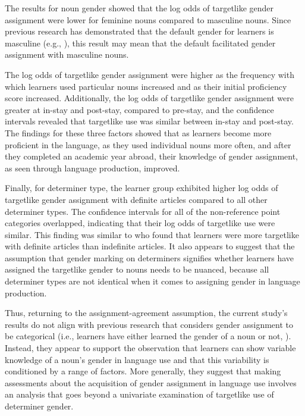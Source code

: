\documentclass[output=paper,colorlinks,citecolor=brown,modfonts,nonflat]{../langscibook}
\begin{document}
The results for noun gender showed that the log odds of targetlike gender assignment were lower for feminine nouns compared to masculine nouns. Since previous research has demonstrated that the default gender for learners is masculine (e.g., \citealt{López-PregoGabriele2012}), this result may mean that the default facilitated gender assignment with masculine nouns.



The log odds of targetlike gender assignment were higher as the frequency with which learners used particular nouns increased and as their initial proficiency score increased. Additionally, the log odds of targetlike gender assignment were greater at in-stay and post-stay, compared to pre-stay, and the confidence intervals revealed that targetlike use was similar between in-stay and post-stay. The findings for these three factors showed that as learners become more proficient in the language, as they used individual nouns more often, and after they completed an academic year abroad, their knowledge of gender assignment, as seen through language production, improved.



Finally, for determiner type, the learner group exhibited higher log odds of targetlike gender assignment with definite articles compared to all other determiner types. The confidence intervals for all of the non-reference point categories overlapped, indicating that their log odds of targetlike use were similar. This finding was similar to \citet{GaravitoWhite2002} who found that learners were more targetlike with definite articles than indefinite articles. It also appears to suggest that the assumption that gender marking on determiners signifies whether learners have assigned the targetlike gender to nouns needs to be nuanced, because all determiner types are not identical when it comes to assigning gender in language production.



Thus, returning to the assignment-agreement assumption, the current study’s results do not align with previous research that considers gender assignment to be categorical (i.e., learners have either learned the gender of a noun or not, \citealt{Alarcón2010}). Instead, they appear to support the observation that learners can show variable knowledge of a noun’s gender in language use and that this variability is conditioned by a range of factors. More generally, they suggest that making assessments about the acquisition of gender assignment in language use involves an analysis that goes beyond a univariate examination of targetlike use of determiner gender.
\end{document}

